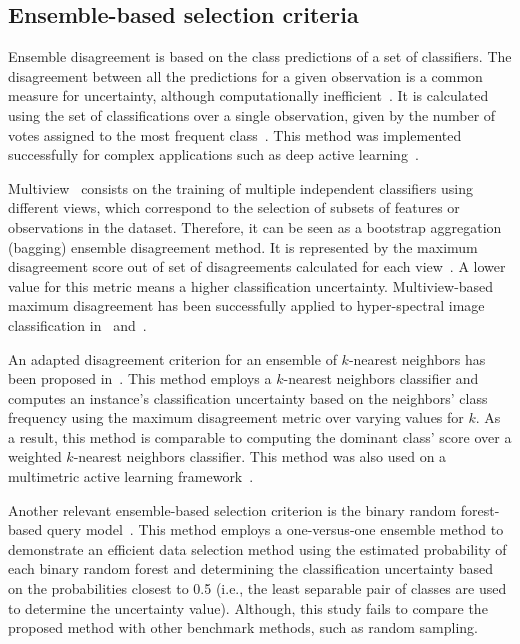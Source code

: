 \documentclass[parskip=full]{scrartcl}
\begin{document}
\subsection{Ensemble-based selection criteria}

Ensemble disagreement is based on the class predictions of a set of
classifiers.  The disagreement between all the predictions for a given
observation is a common measure for uncertainty, although computationally
inefficient~\cite{Ruzicka2020,Pasolli2016}. It is calculated using the set of
classifications over a single observation, given by the number of votes
assigned to the most frequent class~\cite{Shrivastava2021}. This method was
implemented successfully for complex applications such as deep active
learning~\cite{Ruzicka2020}.

Multiview~\cite{Muslea2006} consists on the training of multiple independent
classifiers using different views, which correspond to the selection of subsets
of features or observations in the dataset. Therefore, it can be seen as a
bootstrap aggregation (bagging) ensemble disagreement method. It is represented
by the maximum disagreement score out of set of disagreements calculated for
each view~\cite{Shrivastava2021}. A lower value for this metric means a higher
classification uncertainty. Multiview-based maximum disagreement has been
successfully applied to hyper-spectral image classification in~\cite{Di2012}
and~\cite{Zhou2014}.

An adapted disagreement criterion for an ensemble of $k$-nearest neighbors has
been proposed in~\cite{Pasolli2016}. This method employs a $k$-nearest
neighbors classifier and computes an instance's classification uncertainty
based on the neighbors' class frequency using the maximum disagreement metric
over varying values for $k$. As a result, this method is comparable to
computing the dominant class' score over a weighted $k$-nearest neighbors
classifier. This method was also used on a multimetric active learning
framework~\cite{Zhang2016}.

Another relevant ensemble-based selection criterion is the binary random
forest-based query model~\cite{Su2020}. This method employs a one-versus-one
ensemble method to demonstrate an efficient data selection method using the
estimated probability of each binary random forest and determining the
classification uncertainty based on the probabilities closest to 0.5 (i.e., the
least separable pair of classes are used to determine the uncertainty value).
Although, this study fails to compare the proposed method with other benchmark
methods, such as random sampling.
\end{document}
